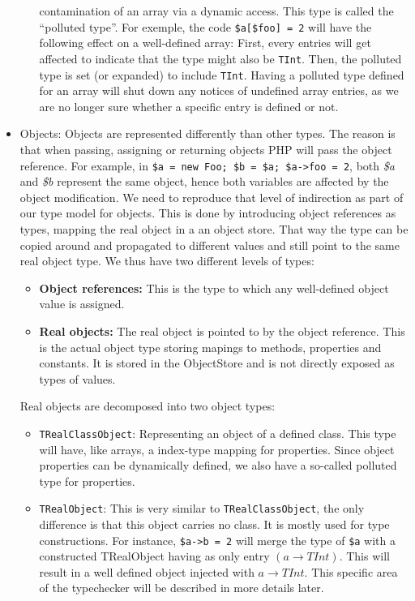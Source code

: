 \documentclass[a4paper]{article}
\begin{document}
\begin{itemize}
\begin{itemize}
          contamination of an array via a dynamic access. This type is called
          the ``polluted type''. For exemple, the code
          \verb/$a[$foo] = 2/ will have the following effect on a well-defined
          array: First, every entries will get affected to indicate that the type
          might also be \verb=TInt=. Then, the polluted type is set (or expanded)
          to include \verb=TInt=. Having a polluted type defined for an array will
          shut down any notices of undefined array entries, as we are no longer sure
          whether a specific entry is defined or not.
    \end{itemize}
  \item Objects: Objects are represented differently than other types. The reason
    is that when passing, assigning or returning objects PHP will pass the 
    object reference. For example, in \verb/$a = new Foo; $b = $a; $a->foo = 2/,
    both \emph{\$a} and \emph{\$b} represent the same object, hence both
    variables are affected by the object modification. We need to reproduce
    that level of indirection as part of our type model for objects. This is
    done by introducing object references as types, mapping the real object in
    a an object store. That way the type can be copied around and propagated to
    different values and still point to the same real object type. We thus have
    two different levels of types:
    \begin{itemize}
          \item \textbf{Object references:} This is the type to which
            any well-defined object value is assigned.
          \item \textbf{Real objects:} The real object is pointed to by the
            object reference. This is the actual object type storing mapings to
            methods, properties and constants. It is stored in the ObjectStore
            and is not directly exposed as types of values.
    \end{itemize}

    Real objects are decomposed into two object types:
    \begin{itemize}
          \item \verb=TRealClassObject=: Representing an object of a
            defined class. This type will have, like arrays, a index-type
            mapping for properties. Since object properties can be dynamically
            defined, we also have a so-called polluted type for properties.
          \item \verb=TRealObject=: This is very similar to
            \verb=TRealClassObject=, the only difference is that this object
            carries no class. It is mostly used for type constructions. For
            instance, \verb/$a->b = 2/ will merge the type of \verb/$a/ with a
            constructed TRealObject having as only entry $(a \rightarrow
            TInt)$. This will result in a well defined object injected with $a
            \rightarrow TInt$. This specific area of the typechecker will be
            described in more details later.
    \end{itemize}
\end{itemize}
\end{document}
